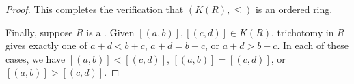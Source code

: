 \begin{proof}
    This completes the verification that $(K(R), \leq)$ is an ordered ring.

    Finally, suppose $R$ is a . Given $[(a,b)], [(c,d)] \in K(R)$, trichotomy in $R$ gives exactly one of $a+d < b+c$, $a+d = b+c$, or $a+d > b+c$. In each of these cases, we have $[(a,b)] < [(c,d)]$, $[(a,b)] = [(c,d)]$, or $[(a,b)] > [(c,d)]$.
\end{proof}